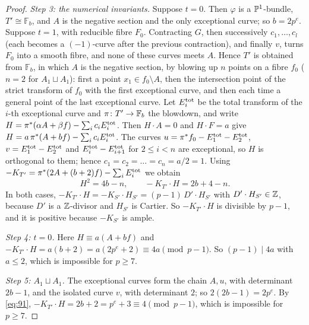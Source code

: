 \begin{proof}
\emph{Step 3: the numerical invariants.}
Suppose $t = 0$.
Then $\varphi$ is a $\mathbb{P}^1$-bundle, $T'\cong\mathbb F_b$, and $A$ is the negative section and the only exceptional curve; so $b = 2p^e$.
Suppose $t = 1$, with reducible fibre $F_0$.
Contracting $G$, then successively $c_1,\dots,c_l$ (each becomes a $(-1)$-curve after the previous contraction), and finally $v$, turns $F_0$ into a smooth fibre, and none of these curves meets $A$.
Hence $T'$ is obtained from $\mathbb F_b$, in which $A$ is the negative section, by blowing up $n$ points on a fibre $f_0$ ($n = 2$ for $A_1\sqcup A_1$): first a point $x_1\in f_0\setminus A$, then the intersection point of the strict transform of $f_0$ with the first exceptional curve, and then each time a general point of the last exceptional curve.
Let $E_i^{\rm tot}$ be the total transform of the $i$-th exceptional curve and $\pi\colon T'\to\mathbb F_b$ the blowdown, and write $H = \pi^*(\alpha A+\beta f)-\sum_ic_iE_i^{\rm tot}$.
Then $H\cdot A = 0$ and $H\cdot F = a$ give $H = a\,\pi^*(A+bf)-\sum_ic_iE_i^{\rm tot}$.
The curves $u = \pi^*f_0-E_1^{\rm tot}-E_2^{\rm tot}$, $v = E_1^{\rm tot}-E_2^{\rm tot}$ and $E_i^{\rm tot}-E_{i+1}^{\rm tot}$ for $2\leq i<n$ are exceptional, so $H$ is orthogonal to them; hence $c_1 = c_2 = \dots = c_n = a/2 = 1$.
Using $-K_{T'} = \pi^*(2A+(b+2)f)-\sum_iE_i^{\rm tot}$ we obtain
\begin{equation}\label{eq:91}
  H^2 = 4b-n,\qquad -K_{T'}\cdot H = 2b+4-n.
\end{equation}
In both cases, $-K_{T'}\cdot H = -K_{S'}\cdot H_{S'} = (p-1)\,D'\cdot H_{S'}$ with $D'\cdot H_{S'}\in\mathbb{Z}$, because $D'$ is a $\mathbb{Z}$-divisor and $H_{S'}$ is Cartier.
So $-K_{T'}\cdot H$ is divisible by $p-1$, and it is positive because $-K_{S'}$ is ample.

\emph{Step 4: $t = 0$.}
Here $H\equiv a(A+bf)$ and $-K_{T'}\cdot H = a(b+2) = a(2p^e+2)\equiv 4a\pmod{p-1}$.
So $(p-1)\mid 4a$ with $a\leq 2$, which is impossible for $p\geq 7$.

\emph{Step 5: $A_1\sqcup A_1$.}
The exceptional curves form the chain $A,u$, with determinant $2b-1$, and the isolated curve $v$, with determinant $2$; so $2(2b-1) = 2p^e$.
By \eqref{eq:91}, $-K_{T'}\cdot H = 2b+2 = p^e+3\equiv 4\pmod{p-1}$, which is impossible for $p\geq 7$.


\end{proof}
